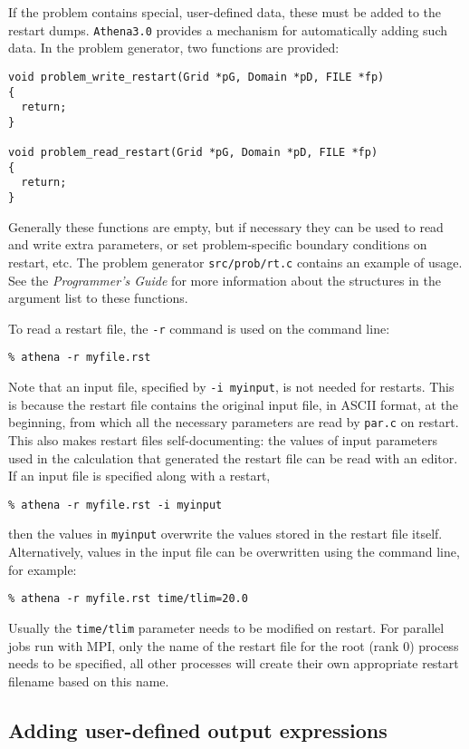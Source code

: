 If the problem contains special, user-defined data, these must be added to the
restart dumps.  {\tt Athena3.0} provides a mechanism for automatically adding
such data.  In the problem generator, two functions are provided:
\begin{verbatim}
void problem_write_restart(Grid *pG, Domain *pD, FILE *fp)
{
  return;
}

void problem_read_restart(Grid *pG, Domain *pD, FILE *fp)
{
  return;
}
\end{verbatim}
Generally these functions are empty, but if necessary they can be used
to read and write extra parameters, or set problem-specific boundary
conditions on restart, etc.  The problem generator {\tt src/prob/rt.c}
contains an example of usage.  See the {\em Programmer's Guide} for more
information about the structures in the argument list to these functions.

To read a restart file, the {\tt -r} command is used on the command line:
\begin{verbatim}
% athena -r myfile.rst
\end{verbatim}
Note that an input file, specified by {\tt -i myinput}, is not needed for
restarts.  This is because the restart file contains the original input file,
in ASCII format, at the beginning, from which all the necessary parameters
are read by {\tt par.c} on restart.  This also makes restart files self-documenting: the values of input parameters used in the calculation that generated
the restart file can be read with an editor.  If an input file is specified
along with a restart,
\begin{verbatim}
% athena -r myfile.rst -i myinput
\end{verbatim}
then the values in {\tt myinput} overwrite the values stored in the restart file
itself.  Alternatively, values in the input file can be overwritten using the
command line, for example:
\begin{verbatim}
% athena -r myfile.rst time/tlim=20.0
\end{verbatim}
Usually the {\tt time/tlim} parameter needs to be modified on restart.
For parallel jobs run with MPI, only the name of the restart file for the
root (rank 0) process needs to be specified, all other processes will 
create their own appropriate restart filename based on this name.

\subsection{Adding user-defined output expressions}

